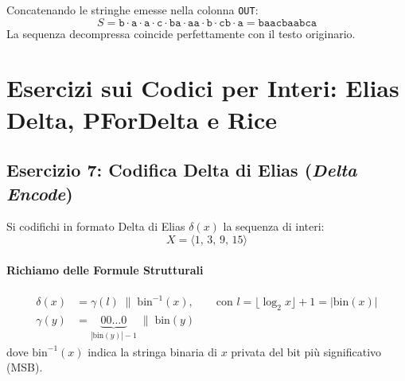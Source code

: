 Concatenando le stringhe emesse nella colonna \texttt{OUT}:
\begin{equation}
  S = \texttt{b} \cdot \texttt{a} \cdot \texttt{a} \cdot \texttt{c} \cdot \texttt{ba} \cdot \texttt{aa} \cdot \texttt{b} \cdot \texttt{cb} \cdot \texttt{a} = \texttt{baacbaabca}
\end{equation}
La sequenza decompressa coincide perfettamente con il testo originario.

\FloatBarrier
\section{Esercizi sui Codici per Interi: Elias Delta, PForDelta e Rice}
\label{sec:esercizi-interi}

\subsection{Esercizio 7: Codifica Delta di Elias (\textit{Delta Encode})}
\label{subsec:es7-elias-delta-encode}

\begin{example}
Si codifichi in formato Delta di Elias $\delta(x)$ la sequenza di interi:
\begin{equation}
  X = \langle 1, \, 3, \, 9, \, 15 \rangle
\end{equation}
\end{example}

\paragraph{Richiamo delle Formule Strutturali}
\begin{align}
  \delta(x) &= \gamma(l) \;\|\; \text{bin}^{-1}(x), \qquad \text{con } l = \lfloor \log_2 x \rfloor + 1 = |\text{bin}(x)| \\
  \gamma(y) &= \underbrace{00\dots0}_{|\text{bin}(y)| - 1} \;\|\; \text{bin}(y)
\end{align}
dove $\text{bin}^{-1}(x)$ indica la stringa binaria di $x$ privata del bit pi\`u significativo (MSB).

